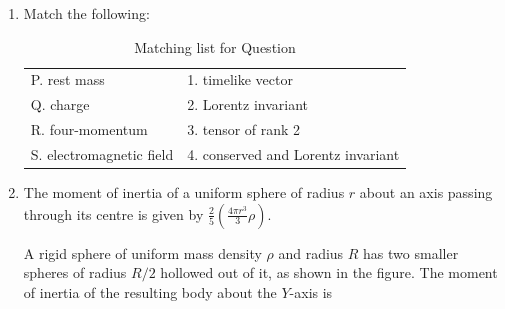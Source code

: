 \documentclass[journal,13pt,onecolumn]{IEEEtran}
\begin{document}
\begin{enumerate}[itemsep = 1em]
\hfill{}

\begin{enumerate}
\end{enumerate}

\item Match the following:

\begin{table}[H]
\centering
\caption{Matching list for Question \theenumi}
\label{tab:q29}
\begin{tabular}{|l|l|}
\hline
P. rest mass & 1. timelike vector \\
Q. charge & 2. Lorentz invariant \\
R. four-momentum & 3. tensor of rank 2 \\
S. electromagnetic field & 4. conserved and Lorentz invariant \\
\hline
\end{tabular}
\end{table}

\hfill{}

\vspace{1em}

\begin{enumerate}
\end{enumerate}

\vspace{2em}

\item The moment of inertia of a uniform sphere of radius $r$ about an axis passing through its centre is given by $\frac{2}{5}\left(\frac{4\pi r^3}{3}\rho\right)$.

A rigid sphere of uniform mass density $\rho$ and radius $R$ has two smaller spheres of radius $R/2$ hollowed out of it, as shown in the figure. The moment of inertia of the resulting body about the $Y$-axis is


\end{enumerate}
\end{document}
